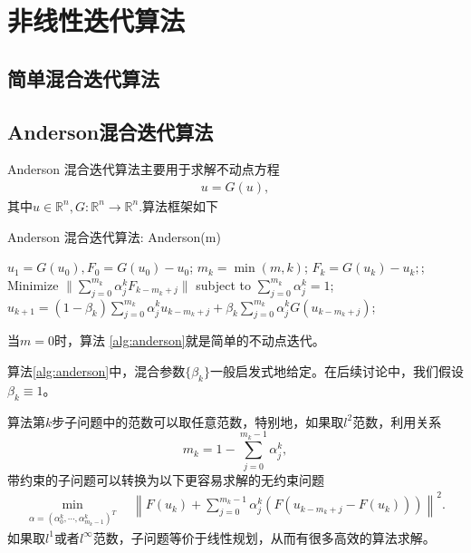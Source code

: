 \section{非线性迭代算法}

\subsection{简单混合迭代算法}

\subsection{Anderson混合迭代算法}
    Anderson 混合迭代算法主要用于求解不动点方程
	\begin{align*}
	u = G(u),
	\end{align*}
	其中$ u\in\mathbb{R}^n, G:\mathbb{R}^n\rightarrow \mathbb{R}^n. $算法框架如下
	\begin{algorithm}[!pbht]
		\caption{Anderson 混合迭代算法: Anderson(m)}
		\label{alg:anderson}
		\begin{algorithmic}[1]
			\STATE $ u_1 = G(u_0) , F_0 = G(u_0) - u_0$;
				\STATE $ m_k = \min(m, k) $;
				\STATE $ F_k = G(u_k) - u_k; $;
				\STATE Minimize $ \| \sum_{j=0}^{m_k}\alpha_j^kF_{k-m_k+j}\| $ subject to $ \sum_{j=0}^{m_k} \alpha^k_j = 1$;
				\STATE $u_{k+1}  = (1-\beta_k)\sum_{j=0}^{m_k}\alpha^k_ju_{k-m_k+j} + \beta_k\sum_{j=0}^{m_k}\alpha^k_jG(u_{k-m_k+j}) $;
			\ENDFOR			
		\end{algorithmic}
	\end{algorithm}
	\begin{remark}
		当$ m = 0 $时，算法 \ref{alg:anderson}就是简单的不动点迭代。
	\end{remark}
	\begin{remark}
		算法\ref{alg:anderson}中，混合参数$ \{\beta_k\} $一般启发式地给定。在后续讨论中，我们假设$ \beta_k\equiv 1 $。
	\end{remark}

	算法第$ k $步子问题中的范数可以取任意范数，特别地，如果取$ l^2 $范数，利用关系
	\begin{equation*}
	m_k = 1- \sum_{j=0}^{m_k-1} \alpha_j^k,
	\end{equation*}
	带约束的子问题可以转换为以下更容易求解的无约束问题
	\begin{align}
	\min_{\alpha = (\alpha_0^k,\cdots,\alpha_{m_k-1}^k)^T }\quad \left\| F(u_k) + \sum_{j=0}^{m_k-1} \alpha_j^k (F(u_{k-m_k+j} - F(u_k))) \right\|^2.
	\label{subpro}
	\end{align}
	如果取$ l^1 $或者$ l^\infty $范数，子问题等价于线性规划，从而有很多高效的算法求解。
	
